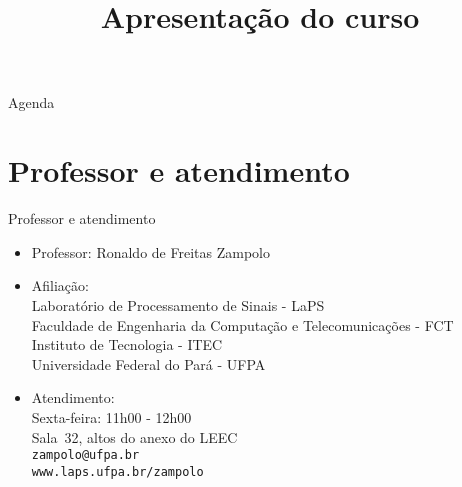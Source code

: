 


\title{\cursogrande\\ \vspace{1cm}Apresentação do curso}


   \maketitle[randomdots={false}]
   \begin{slide}{Agenda}
      \tableofcontents[content=sections]
   \end{slide}

   \section[ slide = true]{Professor e atendimento}
      \begin{slide}[toc=]{Professor e atendimento}
         \begin{itemize}[type=1]
            \item Professor: Ronaldo de Freitas Zampolo 
            \item Afiliação:\\
                  Laboratório de Processamento de Sinais - LaPS\\
                  Faculdade de Engenharia da Computação e Telecomunicações - FCT\\
                  Instituto de Tecnologia - ITEC\\
                  Universidade Federal do Pará - UFPA
            \item Atendimento:\\
                  Sexta-feira: 11h00 - 12h00\\
                  Sala~32, altos do anexo do LEEC\\
                  \texttt{zampolo@ufpa.br}\\ 
                  \texttt{www.laps.ufpa.br/zampolo}
         \end{itemize}
      \end{slide}

